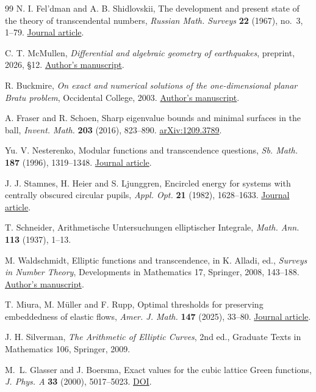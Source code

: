 \documentclass[11pt,a4paper]{article}
\theoremstyle{definition}
\theoremstyle{remark}
\begin{document}
\begin{thebibliography}{99}
 N. I. Fel'dman and A. B. Shidlovskii, The development and present state of the theory of transcendental numbers, \emph{Russian Math. Surveys} \textbf{22} (1967), no.~3, 1--79. \href{https://doi.org/10.1070/RM1967v022n03ABEH001219}{Journal article}.

 C. T. McMullen, \emph{Differential and algebraic geometry of earthquakes}, preprint, 2026, \S12. \href{https://people.math.harvard.edu/~ctm/papers/home/text/papers/eq/eq.pdf}{Author's manuscript}.

 R. Buckmire, \emph{On exact and numerical solutions of the one-dimensional planar Bratu problem}, Occidental College, 2003. \href{https://sites.oxy.edu/ron/research/bratu/bratu.pdf}{Author's manuscript}.

 A. Fraser and R. Schoen, Sharp eigenvalue bounds and minimal surfaces in the ball, \emph{Invent. Math.} \textbf{203} (2016), 823--890. \href{https://arxiv.org/abs/1209.3789}{arXiv:1209.3789}.

 Yu. V. Nesterenko, Modular functions and transcendence questions, \emph{Sb. Math.} \textbf{187} (1996), 1319--1348. \href{https://doi.org/10.4213/sm158}{Journal article}.

 J. J. Stamnes, H. Heier and S. Ljunggren, Encircled energy for systems with centrally obscured circular pupils, \emph{Appl. Opt.} \textbf{21} (1982), 1628--1633. \href{https://doi.org/10.1364/AO.21.001628}{Journal article}.

 T. Schneider, Arithmetische Untersuchungen elliptischer Integrale, \emph{Math. Ann.} \textbf{113} (1937), 1--13.

 M. Waldschmidt, Elliptic functions and transcendence, in K. Alladi, ed., \emph{Surveys in Number Theory}, Developments in Mathematics 17, Springer, 2008, 143--188. \href{https://webusers.imj-prg.fr/~michel.waldschmidt/articles/pdf/SurveyTrdceEllipt2006.pdf}{Author's manuscript}.

 T. Miura, M. M\"uller and F. Rupp, Optimal thresholds for preserving embeddedness of elastic flows, \emph{Amer. J. Math.} \textbf{147} (2025), 33--80. \href{https://doi.org/10.1353/ajm.2025.a950273}{Journal article}.

 J. H. Silverman, \emph{The Arithmetic of Elliptic Curves}, 2nd ed., Graduate Texts in Mathematics 106, Springer, 2009.

 M.~L. Glasser and J. Boersma, Exact values for the cubic lattice Green functions,
\emph{J. Phys. A} \textbf{33} (2000), 5017--5023.
\href{https://doi.org/10.1088/0305-4470/33/28/306}{DOI}.


\end{thebibliography}
\end{document}
